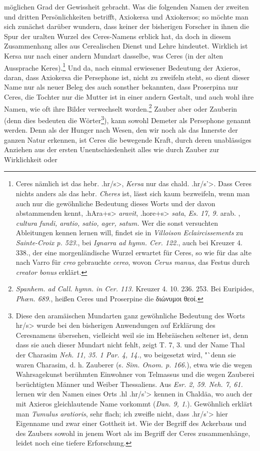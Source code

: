 \documentclass[a4paper, 11pt, oneside]{article}
\newcommand*\symbolAAG{}
\begin{document}
möglichen Grad der Gewissheit gebracht. Was die folgenden Namen der zweiten und dritten Persönlichkeiten betrifft, Axiokersa und Axiokersos; so möchte man sich zunächst darüber wundern, dass keiner der bisherigen Forscher in ihnen die Spur der uralten Wurzel des Ceres-Namens erblick hat, da doch in diesem Zusammenhang alles aus Cerealischen Dienst und Lehre hindeutet. Wirklich ist Kersa nur nach einer andern Mundart dasselbe, was Ceres (in der alten Aussprache Keres).\footnote{Ceres nämlich ist das hebr. \foreignlanguage{hebrew}{\<.hr/s>}, \emph{Kersa} nur das chald. \foreignlanguage{hebrew}{\<.hr/s'>}. Dass Ceres nichts anders als das hebr. \emph{Cheres} ist, lässt sich kaum bezweifeln, wenn man auch nur die gewöhnliche Bedeutung dieses Worts und der davon abstammenden kennt, \foreignlanguage{hebrew}{\<.hAra+s>} \emph{aravit}, \foreignlanguage{hebrew}{\<.hore+s>} \emph{sata}, \emph{Es. 17, 9.} arab. $\symbolAAG$, \emph{cultura fundi, aratio, satio, ager, satum.} Wer die sonst versuchten Ableitungen kennen lernen will, findet sie in \emph{Villoison Eclaircissements} zu \emph{Sainte-Croix p. 523.}, bei \emph{Ignarra ad hymn. Cer. 122.}, auch bei Kreuzer 4. 338., der eine morgenländische Wurzel erwartet für Ceres, so wie für das alte nach Varro für \emph{creo} gebrauchte \emph{cereo}, wovon \emph{Cerus manus}, das Festus durch \emph{creator bonus} erklärt.} Und da, nach einmal erwiesener Bedeutung der Axieros, daran, dass Axiokersa die Persephone ist, nicht zu zweifeln steht, so dient dieser Name nur als neuer Beleg des auch sonsther bekannten, dass Proserpina nur Ceres, die Tochter nur die Mutter ist in einer andern Gestalt, und auch wohl ihre Namen, wie oft ihre Bilder verwechselt worden.\footnote{\emph{Spanhem. ad Call. hymn. in Cer. 113.} Kreuzer 4. 10. 236. 253. Bei Euripides, \emph{Phœn. 689.}, heißen Ceres und Proserpine die διώνυμοι θεοί.} Zauber aber oder Zauberin (denn dies bedeuten die Wörter\footnote{Diese den aramäischen Mundarten ganz gewöhnliche Bedeutung des Worts \foreignlanguage{hebrew}{\<hr/s>} wurde bei den bisherigen Anwendungen auf Erklärung des Ceresnamens übersehen, vielleicht weil sie im Hebräischen seltener ist, denn dass sie auch dieser Mundart nicht fehlt, zeigt T. 7, 3. und der Name Thal der Charasim \emph{Neh. 11, 35. 1 Par. 4, 14.}, wo beigesetzt wird, "`denn sie waren Charasim, d. h. Zauberer (s. \emph{Sim. Onom. p. 166.}), etwa wie die wegen Wahrsagekunst berühmten Einwohner von Telmassus und die wegen Zauberei berüchtigten Männer und Weiber Thessaliens. Aus \emph{Esr. 2, 59. Neh. 7, 61.} lernen wir den Namen eines Orts \foreignlanguage{hebrew}{\<.hl .hr/s'>} kennen in Chaldäa, wo auch der mit Axieros gleichlautende Name vorkommt (\emph{Dan. 9, 1.}). Gewöhnlich erklärt man \emph{Tumulus aratioris}, sehr flach; ich zweifle nicht, dass \foreignlanguage{hebrew}{\<.hr/s'>} hier Eigenname und zwar einer Gottheit ist. Wie der Begriff des Ackerbaus und des Zaubers sowohl in jenem Wort als im Begriff der Ceres zusammenhänge, leidet noch eine tiefere Erforschung.}), kann sowohl Demeter als Persephone genannt werden. Denn als der Hunger nach Wesen, den wir noch als das Innerste der ganzen Natur erkennen, ist Ceres die bewegende Kraft, durch deren unablässiges Anziehen aus der ersten Unentschiedenheit alles wie durch Zauber zur Wirklichkeit oder 
\end{document}
